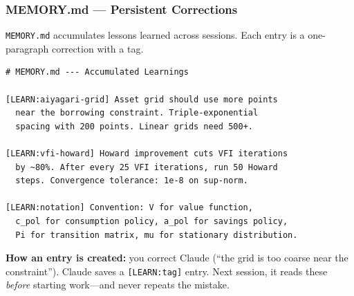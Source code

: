 \documentclass[10pt,english,aspectratio=169]{beamer}
\begin{document}
\begin{frame}[fragile]
\frametitle{MEMORY.md --- Persistent Corrections}

\texttt{MEMORY.md} accumulates lessons learned across sessions. Each entry is a one-paragraph correction with a tag.

\begin{lstlisting}[style=pythonstyle,language={},basicstyle=\ttfamily\scriptsize]
# MEMORY.md --- Accumulated Learnings

[LEARN:aiyagari-grid] Asset grid should use more points
  near the borrowing constraint. Triple-exponential
  spacing with 200 points. Linear grids need 500+.

[LEARN:vfi-howard] Howard improvement cuts VFI iterations
  by ~80%. After every 25 VFI iterations, run 50 Howard
  steps. Convergence tolerance: 1e-8 on sup-norm.

[LEARN:notation] Convention: V for value function,
  c_pol for consumption policy, a_pol for savings policy,
  Pi for transition matrix, mu for stationary distribution.
\end{lstlisting}

\vspace{0.1cm}

\textbf{How an entry is created:} you correct Claude (``the grid is too coarse near the constraint''). Claude saves a \texttt{[LEARN:tag]} entry. Next session, it reads these \textit{before} starting work---and never repeats the mistake.
\end{frame}
\end{document}

